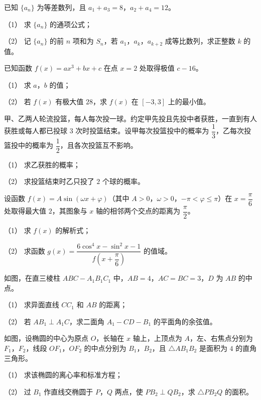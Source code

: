 \begin{question}
已知 $\{a_n\}$ 为等差数列，且 $a_1+a_3=8$，$a_2+a_4=12$。

（1） 求 $\{a_n\}$ 的通项公式；

（2） 记 $\{a_n\}$ 的前 $n$ 项和为 $S_n$，若 $a_1$，$a_k$，$a_{k+2}$ 成等比数列，求正整数 $k$ 的值。

\end{question}
\begin{question}
已知函数 $f(x)=ax^3+bx+c$ 在点 $x=2$ 处取得极值 $c-16$。

（1） 求 $a$，$b$ 的值；

（2） 若 $f(x)$ 有极大值 $28$，求 $f(x)$ 在 $[-3,3]$ 上的最小值。

\end{question}
\begin{question}
甲、乙两人轮流投篮，每人每次投一球。约定甲先投且先投中者获胜，一直到有人获胜或每人都已投球 $3$ 次时投篮结束。设甲每次投篮投中的概率为 $\dfrac13$，乙每次投篮投中的概率为 $\dfrac12$，且各次投篮互不影响。

（1） 求乙获胜的概率；

（2） 求投篮结束时乙只投了 $2$ 个球的概率。

\end{question}
\begin{question}
设函数 $f(x)=A\sin(\omega x+\varphi)$（其中 $A>0$，$\omega>0$，$-\pi<\varphi\leqslant\pi$）在 $x=\dfrac\pi6$ 处取得最大值 $2$，其图象与 $x$ 轴的相邻两个交点的距离为 $\dfrac\pi2$。

（1） 求 $f(x)$ 的解析式；

（2） 求函数 $g(x)=\dfrac{6\cos^4x-\sin^2x-1}{f\left(x+\dfrac\pi6\right)}$ 的值域。

\Needspace{0.4\textheight}
\end{question}
\begin{question}
如图，在直三棱柱 $ABC-A_1B_1C_1$ 中，$AB=4$，$AC=BC=3$，$D$ 为 $AB$ 的中点。

（1） 求异面直线 $CC_1$ 和 $AB$ 的距离；

（2） 若 $AB_1\perp A_1C$，求二面角 $A_1-CD-B_1$ 的平面角的余弦值。
\nopagebreak[4]
\begin{center}\end{center}
\nopagebreak[4]
\Needspace{0.4\textheight}
\end{question}
\begin{question}
如图，设椭圆的中心为原点 $O$，长轴在 $x$ 轴上，上顶点为 $A$，左、右焦点分别为 $F_1$，$F_2$，线段 $OF_1$，$OF_2$ 的中点分别为 $B_1$，$B_2$，且 $\triangle AB_1B_2$ 是面积为 $4$ 的直角三角形。

（1） 求该椭圆的离心率和标准方程；

（2） 过 $B_1$ 作直线交椭圆于 $P$，$Q$ 两点，使 $PB_2\perp QB_2$，求 $\triangle PB_2Q$ 的面积。
\nopagebreak[4]
\begin{center}\end{center}
\nopagebreak[4]

\end{question}